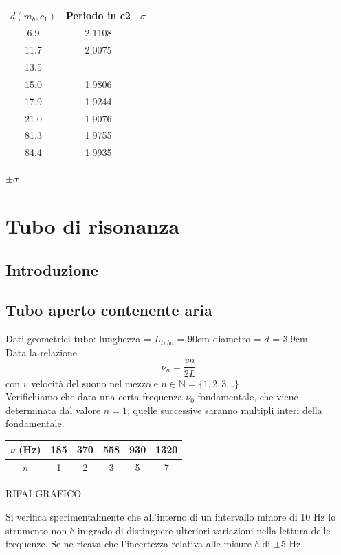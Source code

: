 \documentclass[a4paper,10pt]{report}
\begin{document}
\begin{tabular}{|c|c|c|}
$d(m_b,c_1)$ & Periodo in c2 & $\sigma$ \\
\midrule
6.9 & 2.1108 &\\
11.7 & 2.0075 &\\
13.5 & &\\
15.0 &  1.9806 &\\
17.9 & 1.9244 &\\
21.0 & 1.9076 &\\
81.3 & 1.9755&\\
84.4 & 1.9935&\\
\end{tabular}

$\pm\sigma$

\chapter{Tubo di risonanza}
\section{Introduzione}
\section{Tubo aperto contenente aria}
Dati geometrici tubo:
lunghezza = $L_{tubo}$ = 90cm
diametro = $d$ = 3.9cm
\\
Data la relazione
\begin{equation} \label{eq:gianni}
\nu_n= \frac{vn}{2L}		
\end{equation}
 con $v$ velocità del suono nel mezzo e $n \in \mathbb{N} = \{1,2,3\dots\}$ 
\\

Verifichiamo che data una certa frequenza $\nu_0$ fondamentale, che viene determinata dal valore $n=1$, quelle successive saranno multipli interi della fondamentale. 



\begin{center}
\begin{tabular}{c|c|c|c|c|c}
$\nu$ (Hz) & 185 & 370 & 558 & 930 & 1320 \\
\midrule
$n$ & 1 & 2 & 3 & 5 & 7\\
\end{tabular}
\end{center}

RIFAI GRAFICO

Si verifica sperimentalmente che all'interno di un intervallo minore di 10 Hz lo strumento non è in grado di distinguere ulteriori variazioni nella lettura delle frequenze. Se ne ricava che l'incertezza relativa alle misure è di $\pm$5 Hz.
\end{document}
